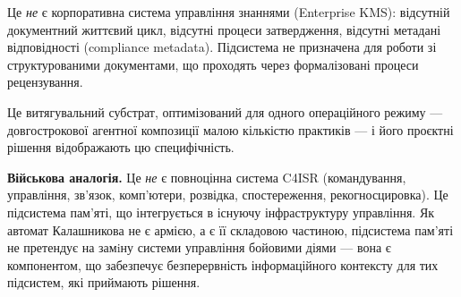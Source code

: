 Це \emph{не} є корпоративна система управління знаннями (Enterprise KMS): відсутній документний життєвий цикл, відсутні процеси затвердження, відсутні метадані відповідності (compliance metadata).
Підсистема не призначена для роботи зі структурованими документами, що проходять через формалізовані процеси рецензування.

Це витягувальний субстрат, оптимізований для одного операційного режиму --- довгострокової агентної композиції малою кількістю практиків --- і його проєктні рішення відображають цю специфічність.

\textbf{Військова аналогія.}
Це \emph{не} є повноцінна система C4ISR (командування, управління, зв'язок, комп'ютери, розвідка, спостереження, рекогносцировка).
Це підсистема пам'яті, що інтегрується в існуючу інфраструктуру управління.
Як автомат Калашникова не є армією, а є її складовою частиною, підсистема пам'яті не претендує на замiну системи управління бойовими діями --- вона є компонентом, що забезпечує безперервність інформаційного контексту для тих підсистем, які приймають рішення.
